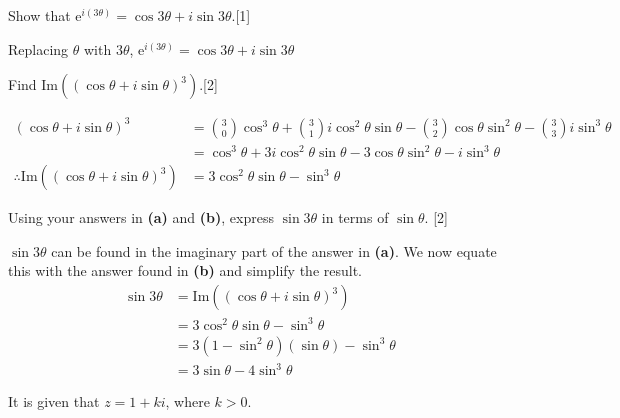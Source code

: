\documentclass[12pt, a4 paper]{article}
\begin{document}
\begin{outline}[enumerate]
	\2 Show that $\mathrm{e}^{i(3\theta)}=\cos{3\theta}+i\sin{3\theta}$.\hfill[1]
	\begin{answer}
		Replacing $\theta$ with $3\theta$, $\mathrm{e}^{i(3\theta)}=\cos{3\theta}+i\sin{3\theta}$
	\end{answer}    
	\2 Find $\textrm{Im}((\cos{\theta}+i\sin{\theta})^3)$.\hfill[2]
	\begin{answer}
		\begin{align*}
			(\cos{\theta}+i\sin{\theta})^3                         & = \binom{3}{0}\cos^3{\theta}+\binom{3}{1}i\cos^2{\theta}\sin{\theta}-\binom{3}{2}\cos{\theta}\sin^2{\theta}-\binom{3}{3}i\sin^3{\theta} \\
			                                                       & = \cos^3{\theta}+3i\cos^2{\theta}\sin{\theta}-3\cos{\theta}\sin^2{\theta}-i\sin^3{\theta}                                               \\
			\therefore \textrm{Im}((\cos{\theta}+i\sin{\theta})^3) & =3\cos^2{\theta}\sin{\theta}-\sin^3{\theta}                                                                                             
		\end{align*}
	\end{answer}    
	\2 Using your answers in \textbf{(a)} and \textbf{(b)}, express $\sin{3\theta}$ in terms of $\sin{\theta}$. \hfill[2]
	\begin{answer}
		$\sin{3\theta}$ can be found in the imaginary part of the answer in \textbf{(a)}. We now equate this with the answer found in \textbf{(b)} and simplify the result.
		\begin{align*}
			\sin{3\theta} & = \textrm{Im}((\cos{\theta}+i\sin{\theta})^3)      \\
			              & = 3\cos^2{\theta}\sin{\theta}-\sin^3{\theta}       \\
			              & = 3(1-\sin^2{\theta})(\sin{\theta})-\sin^3{\theta} \\
			              & = 3\sin{\theta}-4\sin^3{\theta}                    
		\end{align*}
	\end{answer}    
	\1 It is given that $z=1+ki$, where $k>0$. %
		    

\end{outline}
\end{document}

